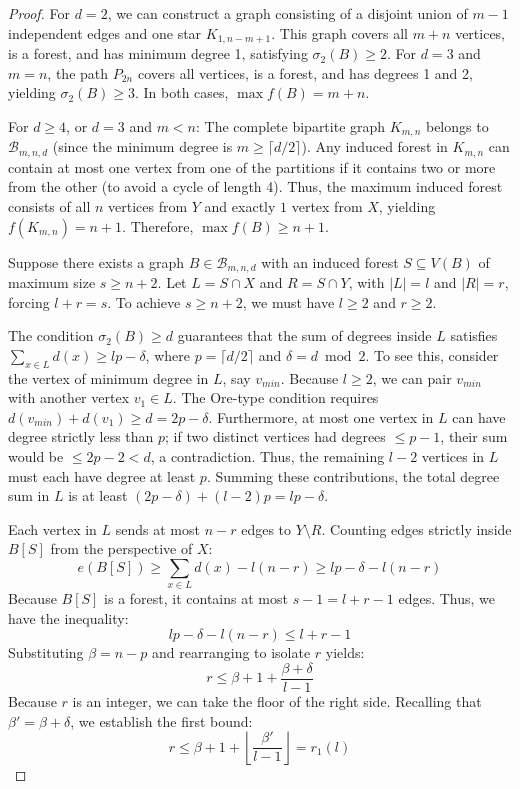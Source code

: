 \documentclass[a4paper]{amsart}
\begin{document}
\begin{proof}
For $d=2$, we can construct a graph consisting of a disjoint union of $m-1$ independent edges and one star $K_{1, n-m+1}$.
This graph covers all $m+n$ vertices, is a forest, and has minimum degree 1, satisfying $\sigma_2(B) \ge 2$.
For $d=3$ and $m=n$, the path $P_{2n}$ covers all vertices, is a forest, and has degrees 1 and 2, yielding $\sigma_2(B) \ge 3$.
In both cases, $\max f(B) = m+n$.

For $d \ge 4$, or $d=3$ and $m < n$: The complete bipartite graph $K_{m,n}$ belongs to $\mathcal{B}_{m,n,d}$ (since the minimum degree is $m \ge \lceil d/2 \rceil$). Any induced forest in $K_{m,n}$ can contain at most one vertex from one of the partitions if it contains two or more from the other (to avoid a cycle of length 4). Thus, the maximum induced forest consists of all $n$ vertices from $Y$ and exactly $1$ vertex from $X$, yielding $f(K_{m,n}) = n+1$. Therefore, $\max f(B) \ge n+1$.

Suppose there exists a graph $B \in \mathcal{B}_{m,n,d}$ with an induced forest $S \subseteq V(B)$ of maximum size $s \ge n+2$.
Let $L = S \cap X$ and $R = S \cap Y$, with $|L| = l$ and $|R| = r$, forcing $l+r = s$.
To achieve $s \ge n+2$, we must have $l \ge 2$ and $r \ge 2$.

The condition $\sigma_2(B) \ge d$ guarantees that the sum of degrees inside $L$ satisfies $\sum_{x \in L} d(x) \ge lp - \delta$, where $p = \lceil d/2 \rceil$ and $\delta = d \bmod 2$.
To see this, consider the vertex of minimum degree in $L$, say $v_{min}$. Because $l \ge 2$, we can pair $v_{min}$ with another vertex $v_1 \in L$. The Ore-type condition requires $d(v_{min}) + d(v_1) \ge d = 2p - \delta$. Furthermore, at most one vertex in $L$ can have degree strictly less than $p$; if two distinct vertices had degrees $\le p-1$, their sum would be $\le 2p-2 < d$, a contradiction. Thus, the remaining $l-2$ vertices in $L$ must each have degree at least $p$. Summing these contributions, the total degree sum in $L$ is at least $(2p - \delta) + (l-2)p = lp - \delta$.

Each vertex in $L$ sends at most $n-r$ edges to $Y \setminus R$.
Counting edges strictly inside $B[S]$ from the perspective of $X$:
\[ e(B[S]) \ge \sum_{x \in L} d(x) - l(n-r) \ge lp - \delta - l(n-r) \]
Because $B[S]$ is a forest, it contains at most $s-1 = l+r-1$ edges.
Thus, we have the inequality:
\[ lp - \delta - l(n-r) \le l+r-1 \]
Substituting $\beta = n-p$ and rearranging to isolate $r$ yields:
\[ r \le \beta + 1 + \frac{\beta + \delta}{l-1} \]
Because $r$ is an integer, we can take the floor of the right side. Recalling that $\beta' = \beta + \delta$, we establish the first bound:
\[ r \le \beta + 1 + \left\lfloor \frac{\beta'}{l-1} \right\rfloor = r_1(l) \]


\end{proof}
\end{document}
